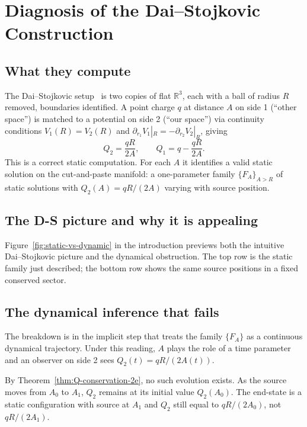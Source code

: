 \documentclass[aps,prd,onecolumn,nofootinbib,superscriptaddress]{revtex4-2}
\begin{document}
\section{Diagnosis of the Dai--Stojkovic Construction}
\label{sec:ds-diagnosis}

\subsection{What they compute}

The Dai--Stojkovic setup~\cite{DaiStojkovic2019Observing} is two copies of
flat $\mathbb{R}^3$, each with a ball of radius $R$ removed, boundaries
identified.  A point charge $q$ at distance $A$ on side 1 (``other space'') is
matched to a potential on side 2 (``our space'') via continuity conditions
$V_1(R)=V_2(R)$ and $\partial_{r_1}V_1|_R = -\partial_{r_2}V_2|_R$, giving
\begin{equation}
\label{eq:DS-Q}
Q_2 = \frac{qR}{2A}, \qquad Q_1 = q - \frac{qR}{2A}.
\end{equation}
This is a correct static computation.  For each $A$ it identifies a valid static
solution on the cut-and-paste manifold: a one-parameter family
$\{F_A\}_{A>R}$ of static solutions with $Q_2(A)=qR/(2A)$ varying with source
position.

\subsection{The D-S picture and why it is appealing}
\label{sec:ds-picture}

Figure~\ref{fig:static-vs-dynamic} in the introduction previews both the
intuitive Dai--Stojkovic picture and the dynamical obstruction.  The top row is
the static family just described; the bottom row shows the same source
positions in a fixed conserved sector.

\subsection{The dynamical inference that fails}

The breakdown is in the implicit step that treats the family $\{F_A\}$ as a
continuous dynamical trajectory.  Under this reading, $A$ plays the role of a
time parameter and an observer on side 2 sees $Q_2(t)=qR/(2A(t))$.

By Theorem~\ref{thm:Q-conservation-2e}, no such evolution exists.  As the
source moves from $A_0$ to $A_1$, $Q_2$ remains at its initial value
$Q_2(A_0)$.  The end-state is a static configuration with source at $A_1$ and
$Q_2$ still equal to $qR/(2A_0)$, not $qR/(2A_1)$.
\end{document}
